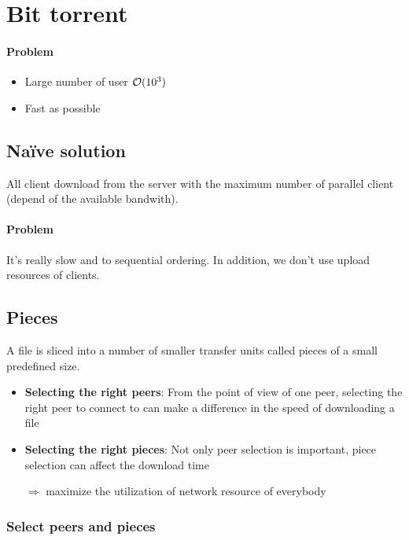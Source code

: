 \section{Bit torrent}

\paragraph{Problem}
\begin{itemize}
\item Large number of user $\mathcal{O}(10^3)$
\item Fast as possible
\end{itemize}

\subsection{Naïve solution}
All client download from the server with the maximum
number of parallel client (depend of the available bandwith).

\paragraph{Problem}
It's really slow and to sequential ordering.
In addition, we don't use upload resources of clients.

\subsection{Pieces}

A file is sliced into a number of smaller transfer units called pieces of a
small predefined size.

\begin{itemize}
\item \textbf{Selecting the right peers}: From the point of view of one peer, selecting the
right peer to connect to can make a difference in the speed of downloading a file
\item \textbf{Selecting the right pieces}: Not only peer selection is important, piece
selection can affect the download time
\item[$\Rightarrow$] maximize the utilization of network resource of everybody
\end{itemize}

\subsubsection{Select peers and pieces}

